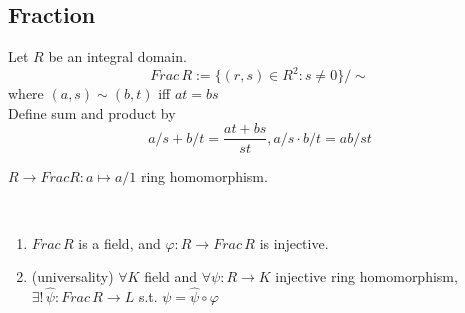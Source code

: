 \subsection{Fraction}
\begin{definition}
    Let  $ R  $ be an integral domain.
    \[Frac\,R:=\{(r,s)\in R^2:s\neq 0\}/\sim\]
    where  $ (a,s)\sim (b,t)  $ iff  $ at=bs $ \\
    Define sum and product by
    \[a/s+b/t=\frac{at+bs }{st },a/s\cdot b/t=ab/st\]
\end{definition}
$ R \rightarrow FracR:a\mapsto a/1 $ ring homomorphism.
\begin{theorem}
    \,
    \begin{enumerate}
        \item  $ Frac\,R $ is a field, and  $ \varphi:R\rightarrow Frac\, R  $ is injective.
        \item (universality) $ \forall K  $ field and  $ \forall \psi:R\rightarrow K $  injective ring homomorphism,  $ \exists !\, \widehat{\psi}:Frac\,R\rightarrow L   $ s.t.  $ \psi=\widehat{\psi}\circ \varphi $  
    \end{enumerate}
\end{theorem}
